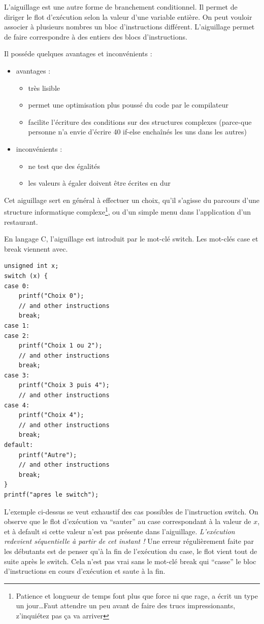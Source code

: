 \documentclass[../../../main.tex]{subfiles}
\begin{document}
L'aiguillage est une autre forme de branchement conditionnel. Il permet de diriger le flot d'exécution selon la valeur d'une variable entière. On peut vouloir associer à plusieurs nombres un bloc d'instructions différent. L'aiguillage permet de faire correspondre à des entiers des blocs d'instructions.
 
Il posséde quelques avantages et inconvénients :
\begin{itemize}
	\item avantages :
	\begin{itemize}
		\item très lisible
		\item permet une optimisation plus poussé du code par le compilateur
		\item facilite l'écriture des conditions sur des structures complexes (parce-que personne n'a envie d'écrire 40 \textsf{if-else} enchaînés les uns dans les autres)
	\end{itemize}
	\item inconvénients : 
	\begin{itemize}
		\item ne test que des égalités
		\item les valeurs à égaler doivent être écrites en dur
	\end{itemize}
\end{itemize}
Cet aiguillage sert en général à effectuer un choix, qu'il s'agisse du parcours d'une structure informatique complexe\footnote{Patience et longueur de temps font plus que force ni que rage, a écrit un type un jour\dots Faut attendre un peu avant de faire des trucs impressionants, z'inquiétez pas ça va arriver}, ou d'un simple menu dans l'application d'un restaurant.
 
En langage C, l'aiguillage est introduit par le mot-clé \textsf{switch}. Les mot-clés \textsf{case} et \textsf{break} viennent avec.
\begin{verbatim}
unsigned int x;
switch (x) {
case 0:
	printf("Choix 0");
	// and other instructions
	break;
case 1:
case 2:
	printf("Choix 1 ou 2");
	// and other instructions
	break;
case 3:
	printf("Choix 3 puis 4");
	// and other instructions
case 4:
	printf("Choix 4");
	// and other instructions
	break;
default:
	printf("Autre");
	// and other instructions
	break;
}
printf("apres le switch");
\end{verbatim}
L'exemple ci-dessus se veut exhaustif des cas possibles de l'instruction \textsf{switch}. On observe que le flot d'exécution va ``sauter'' au \textsf{case} correspondant à la valeur de $x$, et à \textsf{default} si cette valeur n'est pas présente dans l'aiguillage. \textit{L'exécution redevient séquentielle à partir de cet instant !} Une erreur régulièrement faite par les débutants est de penser qu'à la fin de l'exécution du \textsf{case}, le flot vient tout de suite après le switch. Cela n'est pas vrai sans le mot-clé \textsf{break} qui ``casse'' le bloc d'instructions en cours d'exécution et saute à la fin.
 
\end{document}
